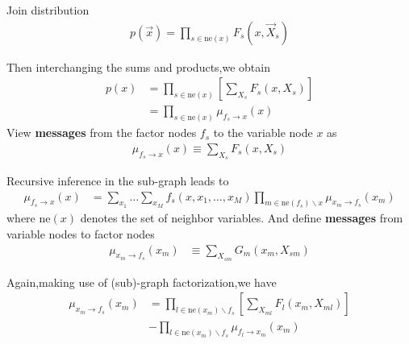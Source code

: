 Join distribution 
\begin{align}
p(\vec{x}) =\prod_{s\in \text{ne}(x)}{F_s(x,\vec{X}_s)}
\end{align}

Then interchanging the sums and products,we obtain
\begin{align}
p(x) &= \prod_{s\in\text{ne}(x)}{\left[\sum_{X_s}F_s(x,X_s)\right]} \\
&= \prod_{s\in\text{ne}(x)}\mu_{f_s\rightarrow x}(x)
\end{align}
View \textbf{messages} from the factor nodes $f_s$ to the variable node $x$ as
\begin{align}
\mu_{f_s\rightarrow x}(x)\equiv \sum_{X_s}F_s(x,X_s)
\end{align}

Recursive inference in the sub-graph leads to 
\begin{align}
\mu_{f_s\rightarrow x}(x) &= \sum_{x_1}\ldots\sum_{x_M} f_s(x,x_1,\ldots,x_M)\prod_{m\in \text{ne}(f_s)\backslash x} \mu_{x_m\rightarrow f_s}(x_m) 
\end{align}
where $\text{ne}(x)$ denotes the set of neighbor variables.
And define \textbf{messages} from variable nodes to factor nodes
\begin{align}
\mu_{x_m\rightarrow f_s}(x_m) &\equiv \sum_{X_{sm}}G_m(x_m,X_{sm})
\end{align}

Again,making use of (sub)-graph factorization,we have
\begin{align}
\mu_{x_m\rightarrow f_s}(x_m) &= \prod_{l\in \text{ne}(x_m)\backslash f_s}\left[\sum_{X_{ml}}F_l(x_m,X_{ml}) \right] \\
&-\prod_{l\in \text{ne}(x_m)\backslash f_s}\mu_{f_l\rightarrow x_m}(x_m)
\end{align}


